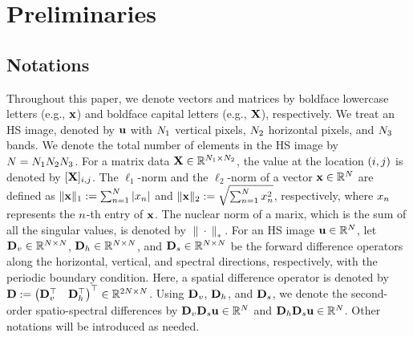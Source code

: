 \section{Preliminaries}
\label{sec:Preliminaries}

\subsection{Notations}
\label{subsec:Notations}
Throughout this paper, we denote vectors and matrices by boldface lowercase letters (e.g., $\mathbf{x}$) and boldface capital letters (e.g., $\mathbf{X}$), respectively.
We treat an HS image, denoted by $\mathbf{u}$ with $N_{1}$ vertical pixels, $N_{2}$ horizontal pixels, and $N_{3}$ bands.
We denote the total number of elements in the HS image by $N = N_{1} N_{2} N_{3}$.
For a matrix data $\mathbf{X} \in \mathbb{R}^{N_{1} \times N_{2}}$, the value at the location $(i, j)$ is denoted by $[\mathbf{X}]_{i,j}$.
The $\ell_{1}$-norm and the $\ell_{2}$-norm of a vector $\mathbf{x} \in \mathbb{R}^{N}$ are defined as $\| \mathbf{x} \|_{1} := \sum_{n=1}^{N} | x_{n} |$ and $\| \mathbf{x} \|_{2} := \sqrt{\sum_{n=1}^{N} x_{n}^{2}}$, respectively, where  $x_{n}$ represents the $n$-th entry of $\mathbf{x}$.
The nuclear norm of a marix, which is the sum of all the singular values, is denoted by $\| \cdot \|_{*}$.
For an HS image $\mathbf{u} \in \mathbb{R}^{N}$, let $\mathbf{D}_{v} \in \mathbb{R}^{N \times N}$, $\mathbf{D}_{h} \in \mathbb{R}^{N \times N}$, and $\mathbf{D}_{s} \in \mathbb{R}^{N \times N}$ be the forward difference operators along the horizontal, vertical, and spectral directions, respectively, with the periodic boundary condition.
Here, a spatial difference operator is denoted by $\mathbf{D} := \begin{pmatrix} \mathbf{D}_{v}^{\top} & \mathbf{D}_{h}^{\top} \end{pmatrix}^{\top} \in \mathbb{R}^{2 N \times N}$. 
Using $\mathbf{D}_{v}$, $\mathbf{D}_{h}$, and $\mathbf{D}_{s}$, we denote the second-order spatio-spectral differences by $\mathbf{D}_{v} \mathbf{D}_{s} \mathbf{u} \in \mathbb{R}^{N}$ and $\mathbf{D}_{h} \mathbf{D}_{s} \mathbf{u} \in \mathbb{R}^{N}$.
Other notations will be introduced as needed.



